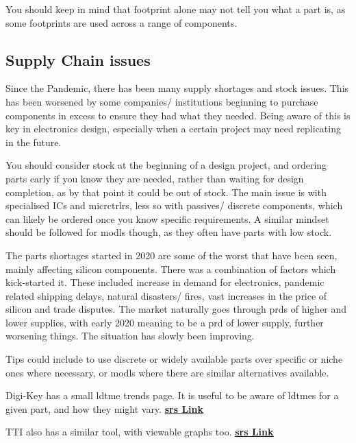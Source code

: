 \documentclass[a4paper,11pt]{report}
\let\oldhref\href %
\renewcommand{\href}[2]{\oldhref{#1}{\bf\gls{srs} #2}}
\begin{document}
You should keep in mind that footprint alone may not tell you what a part is, as some footprints are used across a range of components.

\vspace*{1\baselineskip}

\subsection{Supply Chain issues}

Since the Pandemic, there has been many supply shortages and stock issues. This has been worsened by some companies/ institutions beginning to purchase components in excess to ensure they had what they needed. Being aware of this is key in electronics design, especially when a certain project may need replicating in the future.

You should consider stock at the beginning of a design project, and ordering parts early if you know they are needed, rather than waiting for design completion, as by that point it could be out of stock. The main issue is with specialised ICs and \gls{micrctrlr}s, less so with passives/ discrete components, which can likely be ordered once you know specific requirements. A similar mindset should be followed for \gls{modl}s though, as they often have parts with low stock.

The parts shortages started in 2020 are some of the worst that have been seen, mainly affecting silicon components. There was a combination of factors which kick-started it. These included increase in demand for electronics, pandemic related shipping delays, natural disasters/ fires, vast increases in the price of silicon and trade disputes. The market naturally goes through \gls{prd}s of higher and lower supplies, with early 2020 meaning to be a \gls{prd} of lower supply, further worsening things. The situation has slowly been improving.

Tips could include to use discrete or widely available parts over specific or niche ones where necessary, or \gls{modl}s where there are similar alternatives available.

Digi-Key has a small \gls{ldtme} trends page. It is useful to be aware of \gls{ldtme}s for a given part, and how they might vary. \href{https://www.digikey.co.uk/en/resources/reports/lead-time-trends}{Link}

TTI also has a similar tool, with viewable graphs too. \href{https://www.tti.com/content/ttiinc/en/apps/lead-time-trends.html}{Link}
\end{document}
